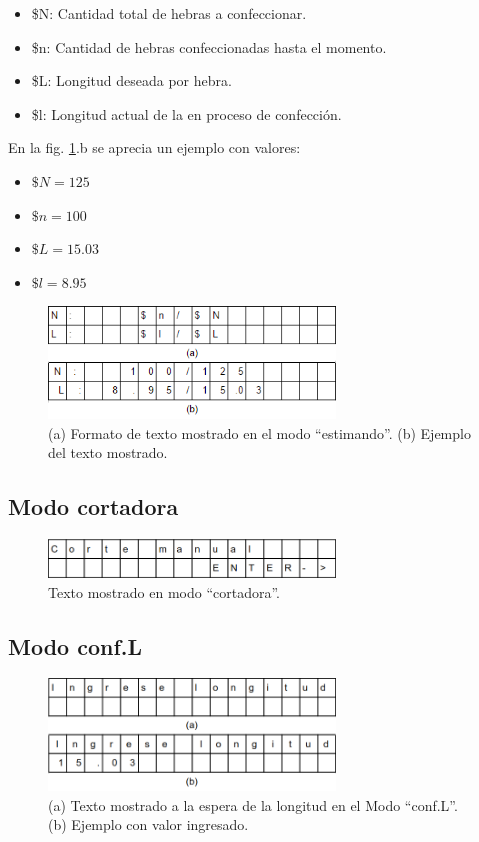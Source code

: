 \documentclass[main_conf.tex]{subfiles}
\begin{document}
\begin{itemize}
\item \$N: Cantidad total de hebras a confeccionar.
\item \$n: Cantidad de hebras confeccionadas hasta el momento.
\item \$L: Longitud deseada por hebra.
\item \$l: Longitud actual de la en proceso de confección.
\end{itemize}

En la fig. \ref{Modo_estimando}.b se aprecia un ejemplo con valores:
\begin{itemize}
\item $\$N = 125$
\item $\$n = 100$
\item $\$L = 15.03$
\item $\$l = 8.95$
\end{itemize}

\begin{figure}[!t]
  \centering
  \includegraphics[width=3.0in]{../img/Modo_estimando.png}
  \caption{(a) Formato de texto mostrado en el modo “estimando”.
           (b) Ejemplo del texto mostrado.
  }
  \label{Modo_estimando}
\end{figure}

\subsection{Modo cortadora}

\begin{figure}[h]
  \centering
  \includegraphics[width=3.0in]{../img/Modo_cortadora.png}
  \caption{Texto mostrado en modo “cortadora”.}
  \label{Modo_cortadora}
\end{figure}

\subsection{Modo conf.L}

\begin{figure}[!t]
  \centering
  \includegraphics[width=3.0in]{../img/Modo_Conf_L.png}
  \caption{(a) Texto mostrado a la espera de la longitud en el Modo “conf.L”.
           (b) Ejemplo con valor ingresado.
  }
  \label{Modo_Conf_L}
\end{figure}
\end{document}
